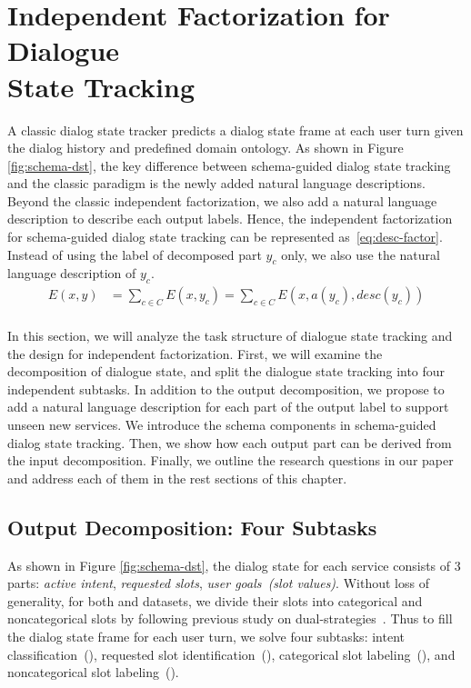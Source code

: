 
\section[Independent Factorization for Dialogue State Tracking]{Independent Factorization for Dialogue \\State Tracking}
\label{sec:sgd:ind-factorization}
A classic dialog state tracker predicts a dialog state frame at each
user turn given the dialog history and predefined domain ontology. As
shown in Figure \ref{fig:schema-dst}, the key difference between
schema-guided dialog state tracking and the classic paradigm is the
newly added natural language descriptions. Beyond the classic
independent factorization, we also add a natural language description
to describe each output labels. Hence, the independent factorization
for schema-guided dialog state tracking can be represented
as~\autoref{eq:desc-factor}. Instead of using the label of decomposed
part $y_{c}$ only, we also use the natural language description of
$y_{c}$.
\begin{equation}
    \label{eq:desc-factor}
    \begin{split}
    E(x, y) & =\sum_{c \in C} E(x, y_{c}) = \sum_{c \in C}E(x, a(y_{c}), desc(y_{c}))  \\
    \end{split}
\end{equation}

In this section, we will
analyze the task structure of dialogue state tracking and the design
for independent factorization. First, we will examine the
decomposition of dialogue state, and split the dialogue state tracking
into four independent subtasks. In addition to the output
decomposition, we propose to add a natural language description for
each part of the output label to support unseen new services. We
introduce the schema components in schema-guided dialog state
tracking. Then, we show how each output part can be derived from the
input decomposition. Finally, we outline the research questions in
our paper and address each of them in the rest sections of this
chapter.

\subsection{Output Decomposition: Four Subtasks}
\label{sec:sgd:decompose-y}
As shown in Figure \ref{fig:schema-dst}, the dialog state for each
service consists of 3 parts: {\it active intent}, {\it requested
  slots}, {\it user goals~(slot values)}. Without loss of generality,
for both \sgdst and \multiwoz datasets, we divide their slots into
categorical and noncategorical slots by following previous study on
dual-strategies~\cite{zhang2019find}. Thus to fill the dialog state
frame for each user turn, we solve four  subtasks:
intent classification~(\IC), requested slot identification~(\RSI),
categorical slot labeling~(\CSL), and noncategorical slot
labeling~(\NSL).

